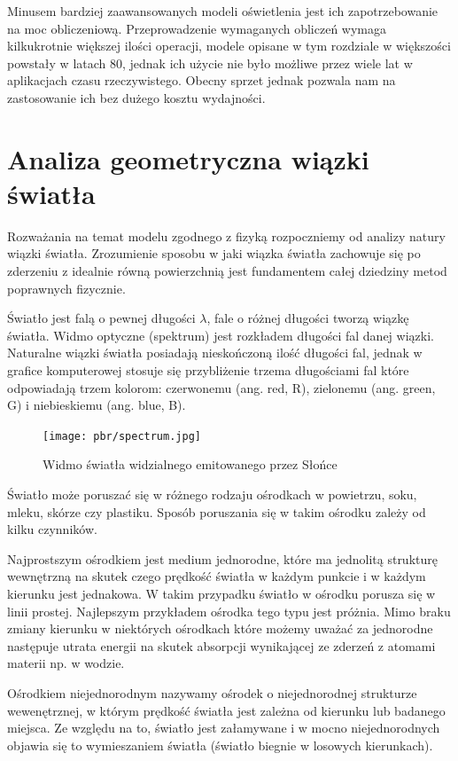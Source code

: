 \documentclass[../main.tex]{subfiles}
\begin{document}
Minusem bardziej zaawansowanych modeli oświetlenia jest ich zapotrzebowanie na
moc obliczeniową. Przeprowadzenie wymaganych obliczeń wymaga kilkukrotnie
większej ilości operacji, modele opisane w tym rozdziale w większości powstały
w latach 80, jednak ich użycie nie było możliwe przez wiele lat w aplikacjach
czasu rzeczywistego. Obecny sprzet jednak pozwala nam na zastosowanie ich bez
dużego kosztu wydajności.

\section{Analiza geometryczna wiązki światła}

Rozważania na temat modelu zgodnego z fizyką rozpoczniemy od analizy natury
wiązki światła. Zrozumienie sposobu w jaki wiązka światła zachowuje się po
zderzeniu z idealnie równą powierzchnią jest fundamentem całej dziedziny metod
poprawnych fizycznie.

Światło jest falą o pewnej długości $\lambda$, fale o różnej długości tworzą
wiązkę światła. Widmo optyczne (spektrum) jest rozkładem długości fal danej
wiązki. Naturalne wiązki światła posiadają nieskończoną ilość długości fal,
jednak w grafice komputerowej stosuje się przybliżenie trzema długościami fal
które odpowiadają trzem kolorom: czerwonemu (ang. red, R), zielonemu (ang.
green, G) i niebieskiemu (ang. blue, B).

\begin{figure}[ht]
  \centering
  \texttt{[image: pbr/spectrum.jpg]}
  \caption{Widmo światła widzialnego emitowanego przez Słońce}
\end{figure}

Światło może poruszać się w różnego rodzaju ośrodkach w powietrzu, soku, mleku,
skórze czy plastiku. Sposób poruszania się w takim ośrodku zależy od kilku
czynników.

Najprostszym ośrodkiem jest medium jednorodne, które ma jednolitą strukturę
wewnętrzną na skutek czego prędkość światła w każdym punkcie i w każdym
kierunku jest jednakowa. W takim przypadku światło w ośrodku porusza się w
linii prostej. Najlepszym przykładem ośrodka tego typu jest próżnia. Mimo braku
zmiany kierunku w niektórych ośrodkach które możemy uważać za jednorodne
następuje utrata energii na skutek absorpcji wynikającej ze zderzeń z atomami
materii np. w wodzie.

Ośrodkiem niejednorodnym nazywamy ośrodek o niejednorodnej strukturze
wewenętrznej, w którym prędkość światła jest zależna od kierunku lub badanego
miejsca. Ze względu na to, światło jest załamywane i w mocno niejednorodnych
objawia się to  wymieszaniem światła (światło biegnie w losowych kierunkach).
\end{document}
